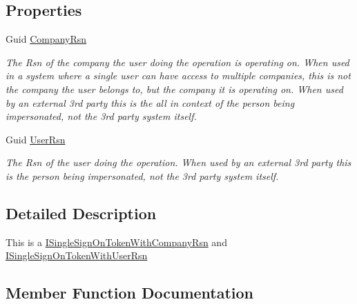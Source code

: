 \subsection*{Properties}
\begin{DoxyCompactItemize}
\item 
Guid \hyperlink{classCqrs_1_1Authentication_1_1SingleSignOnTokenWithUserRsnAndCompanyRsn_ae81ee4a4935b762a1ed2504ea321c517}{Company\+Rsn}
\begin{DoxyCompactList}\small\item\em The Rsn of the company the user doing the operation is operating on. When used in a system where a single user can have access to multiple companies, this is not the company the user belongs to, but the company it is operating on. When used by an external 3rd party this is the all in context of the person being impersonated, not the 3rd party system itself. \end{DoxyCompactList}\item 
Guid \hyperlink{classCqrs_1_1Authentication_1_1SingleSignOnTokenWithUserRsnAndCompanyRsn_a4963f5699921952ac8b6439d5308090d}{User\+Rsn}
\begin{DoxyCompactList}\small\item\em The Rsn of the user doing the operation. When used by an external 3rd party this is the person being impersonated, not the 3rd party system itself. \end{DoxyCompactList}\end{DoxyCompactItemize}


\subsection{Detailed Description}
This is a \hyperlink{interfaceCqrs_1_1Authentication_1_1ISingleSignOnTokenWithCompanyRsn}{I\+Single\+Sign\+On\+Token\+With\+Company\+Rsn} and \hyperlink{interfaceCqrs_1_1Authentication_1_1ISingleSignOnTokenWithUserRsn}{I\+Single\+Sign\+On\+Token\+With\+User\+Rsn} 



\subsection{Member Function Documentation}
\mbox{\label{classCqrs_1_1Authentication_1_1SingleSignOnTokenWithUserRsnAndCompanyRsn_a8d44249c00e5264dc7b37f4868836a80}} 
